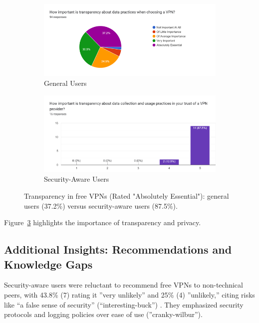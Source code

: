 \documentclass[11pt,a4paper]{article}
\begin{document}
\begin{figure}[ht]
    \centering
    \begin{subfigure}[t]{1.0\columnwidth}
        \centering
        \includegraphics[width=\linewidth]{generaluserimportance.png}
        \caption{General Users}
        \label{fig:general_risks}
    \end{subfigure}
    \hfill
    \begin{subfigure}[t]{1.0\columnwidth}
        \centering
        \includegraphics[width=\linewidth]{importancesecurityaware.png}
        \caption{Security-Aware Users}
        \label{fig:security_risks}
    \end{subfigure}
    \caption{Transparency in free VPNs (Rated "Absolutely Essential"): general users (37.2\%) versus security-aware users (87.5\%).}
    \label{fig:risks_comparison}
\end{figure}

Figure~\ref{fig:risks_comparison} highlights the importance of transparency and privacy.

\subsection{Additional Insights: Recommendations and Knowledge Gaps}
Security-aware users were reluctant to recommend free VPNs to non-technical peers, with 43.8\% (7) rating it ''very unlikely'' and 25\% (4) ''unlikely,'' citing risks like ``a false sense of security'' (``interesting-buck'') \citep{Shetty2025}. They emphasized security protocols and logging policies over ease of use (''cranky-wilbur'').
\end{document}
